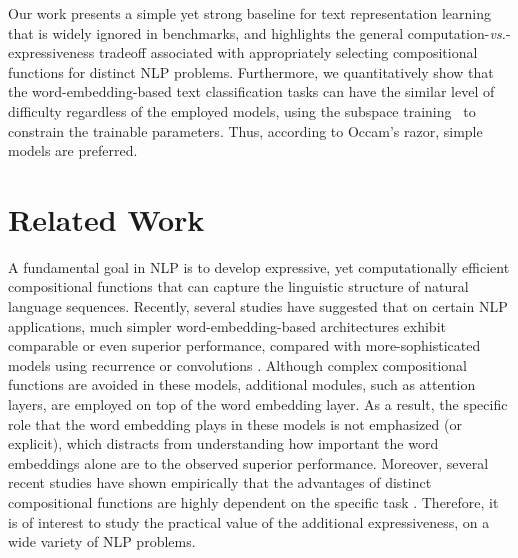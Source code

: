 \documentclass[11pt,a4paper]{article}
\begin{document}
Our work presents a simple yet strong baseline for text representation learning that is widely ignored in benchmarks, and highlights the general computation-\emph{vs.}-expressiveness tradeoff associated with appropriately selecting compositional functions for distinct NLP problems.
Furthermore, we quantitatively show that the word-embedding-based text classification tasks can have the similar level of difficulty regardless of the employed models, using the subspace training~\cite{li_id_2018_ICLR} to constrain the trainable parameters. Thus, according to Occam's razor, simple models are preferred.

\section{Related Work}\label{related_work}
A fundamental goal in NLP is to develop expressive, yet computationally efficient compositional functions that can capture the linguistic structure of natural language sequences.
Recently, several studies have suggested that on certain NLP applications, much simpler word-embedding-based architectures exhibit comparable or even superior performance, compared with more-sophisticated models using recurrence or convolutions \citep{parikh2016decomposable, vaswani2017attention}.
Although complex compositional functions are avoided in these models, additional modules, such as attention layers, are employed on top of the word embedding layer.
As a result, the specific role that the word embedding plays in these models is not emphasized (or explicit), which distracts from understanding how important the word embeddings alone are to the observed superior performance.
Moreover, several recent studies have shown empirically that the advantages of distinct compositional functions are highly dependent on the specific task \citep{mitchell2010composition, iyyer2015deep, zhang2015fixed, wieting2015towards, arora2016simple}.
Therefore, it is of interest to study the practical value of the additional expressiveness, on a wide variety of NLP problems.
\end{document}
